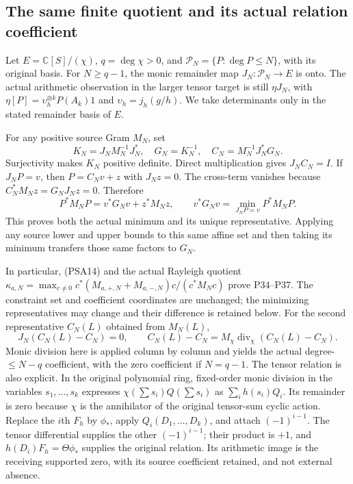 \documentclass{article}
\begin{document}
\subsection{The same finite quotient and its actual relation coefficient}

Let $E=\mathbb C[S]/(\chi)$, $q=\deg\chi>0$, and
$\mathcal P_N=\{P:\deg P\le N\}$, with its original basis.
For $N\ge q-1$, the monic remainder map $J_N:\mathcal P_N\to E$
is onto. The actual arithmetic observation in the larger tensor target
is still $\eta J_N$, with
$\eta[P]=\upsilon_h^{\otimes k}P(A_k)1$ and
$\upsilon_h=j_h(g/h)$. We take determinants only in the stated
remainder basis of $E$.

For any positive source Gram $M_N$, set
\[
 K_N=J_NM_N^{-1}J_N^*,\quad G_N=K_N^{-1},\quad
 C_N=M_N^{-1}J_N^*G_N.
 \tag{PSA17}
\]
Surjectivity makes $K_N$ positive definite. Direct multiplication
gives $J_NC_N=I$. If $J_NP=v$, then $P=C_Nv+z$ with $J_Nz=0$.
The cross-term vanishes because
$C_N^*M_Nz=G_NJ_Nz=0$. Therefore
\[
 P^*M_NP=v^*G_Nv+z^*M_Nz,
 \qquad v^*G_Nv=\min_{J_NP=v}P^*M_NP.
 \tag{PSA18}
\]
This proves both the actual minimum and its unique representative.
Applying any source lower and upper bounds to this same affine set
and then taking its minimum transfers those same factors to $G_N$.

In particular, (PSA14) and the actual Rayleigh quotient
$\kappa_{a,N}=\max_{c\ne0}
c^*(M_{a,+,N}+M_{a,-,N})c/(c^*M_Nc)$ prove P34--P37.
The constraint set and coefficient coordinates are unchanged; the
minimizing representatives may change and their difference is retained
below. For the second representative
$C_N(L)$ obtained from $M_N(L)$,
\[
 J_N(C_N(L)-C_N)=0,\qquad
 C_N(L)-C_N=M_\chi\operatorname{div}_\chi(C_N(L)-C_N).
 \tag{PSA19}
\]
Monic division here is applied column by column and yields the actual
degree-$\le N-q$ coefficient, with the zero coefficient if $N=q-1$.
The tensor relation is also explicit. In the original polynomial
ring, fixed-order monic division in the variables $s_1,\ldots,s_k$
expresses $\chi(\sum s_i)Q(\sum s_i)$ as $\sum_i h(s_i)Q_i$.
Its remainder is zero because $\chi$ is the annihilator of the
original tensor-sum cyclic action. Replace the $i$th $F_h$ by
$\phi_*$, apply $Q_i(D_1,\ldots,D_k)$, and attach
$(-1)^{i-1}$. The tensor differential supplies the other
$(-1)^{i-1}$; their product is $+1$, and
$h(D_i)F_h=\Theta\phi_*$ supplies the original relation. Its
arithmetic image is the receiving supported zero, with its source
coefficient retained, and not external absence.
\end{document}
